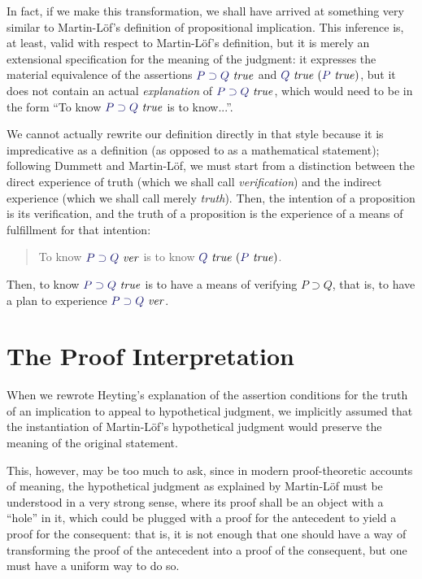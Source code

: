 \documentclass[11pt]{amsart}
\theoremstyle{definition}
\theoremstyle{remark}
\numberwithin{equation}{section}
\def\InputModeColorName{MidnightBlue}
\newcommand\InputMode[1]{{\color{\InputModeColorName}{#1}}}
\newcommand\HypJ[2]{#1\ (#2)}
\newcommand\IsVer[1]{\InputMode{#1}\ \mathit{ver}}
\newcommand\IsTrue[1]{\InputMode{#1}\ \mathit{true}}
\newcommand\Imp[2]{#1\supset #2}
\begin{document}
In fact, if we make this transformation, we shall have arrived at something very
similar to Martin-L\"of's definition of propositional implication. This
inference is, at least, valid with respect to Martin-L\"of's definition, but it
is merely an extensional specification for the meaning of the judgment: it
expresses the material equivalence of the assertions $\IsTrue{\Imp{P}{Q}}$ and
$\HypJ{\IsTrue{Q}}{\IsTrue{P}}$, but it does not contain an actual
\emph{explanation} of $\IsTrue{\Imp{P}{Q}}$, which would need to be in the form ``To
know $\IsTrue{\Imp{P}{Q}}$ is to know...''.

We cannot actually rewrite our definition directly in that style because it is
impredicative as a definition (as opposed to as a mathematical statement);
following Dummett \cite{Dummett:Elements} and Martin-L\"of, we must start from a
distinction between the direct experience of truth (which we shall call
\emph{verification}) and the indirect experience (which we shall call merely
\emph{truth}). Then, the intention of a proposition is its verification, and the
truth of a proposition is the experience of a means of fulfillment for that
intention:

\begin{quote}
  To know $\IsVer{\Imp{P}{Q}}$ is to know $\HypJ{\IsTrue{Q}}{\IsTrue{P}}$.
\end{quote}

Then, to know $\IsTrue{\Imp{P}{Q}}$ is to have a means of verifying $\Imp{P}{Q}$, that
is, to have a plan to experience $\IsVer{\Imp{P}{Q}}$.

\section{The Proof Interpretation}

When we rewrote Heyting's explanation of the assertion conditions for the truth
of an implication to appeal to hypothetical judgment, we implicitly assumed that
the instantiation of Martin-L\"of's hypothetical judgment would preserve the
meaning of the original statement.

This, however, may be too much to ask, since in modern proof-theoretic accounts
of meaning, the hypothetical judgment as explained by Martin-L\"of must be
understood in a very strong sense, where its proof shall be an object with a
``hole'' in it, which could be plugged with a proof for the antecedent to yield
a proof for the consequent: that is, it is not enough that one should have a way
of transforming the proof of the antecedent into a proof of the consequent, but
one must have a uniform way to do so.
\end{document}
